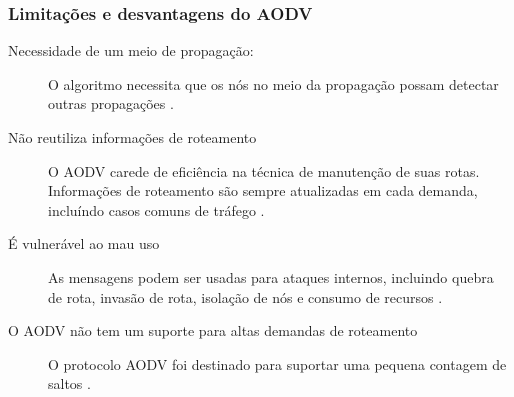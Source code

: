 \subsubsection{Limita\c{c}\~oes e desvantagens do AODV}
\begin{description}
	\item[Necessidade de um meio de propaga\c{c}\~ ao:] O algoritmo necessita que os n\'os no meio da propaga\c{c}\~ ao possam detectar outras propaga\c{c}\~oes \cite{gorantala}.
	\item[N\~ao reutiliza informa\c{c}\~oes de roteamento] O AODV carede de efici\^encia na t\'ecnica de manuten\c{c}\~ao de suas rotas. Informa\c{c}\~oes de roteamento s\~ao sempre atualizadas em cada demanda, inclu\'indo casos comuns de tr\'afego \cite{ramachandran}.
	\item[\'E vulner\'avel ao mau uso] As mensagens podem ser usadas para ataques internos, incluindo quebra de rota, invas\~ao de rota, isola\c{c}\~ao de n\'os e consumo de recursos \cite{ning}.
	\item[O AODV n\~ao tem um suporte para altas demandas de roteamento] O protocolo AODV foi destinado para suportar uma pequena contagem de saltos \cite{ramachandran}.
\end{description}
